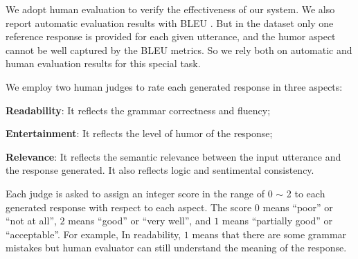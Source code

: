 \documentclass[letterpaper]{article} %
\begin{document}
\begin{CJK*}{UTF8}{gbsn}
We adopt human evaluation to verify the effectiveness of our system. We also report automatic evaluation results with BLEU \cite{papineni2002bleu}. But in the dataset only one reference response is provided for each given utterance, and the humor aspect cannot be well captured by the BLEU metrics. %
So we rely both on automatic and human evaluation results for this special task. 

We employ two human judges to rate each generated response in three aspects:

\textbf{Readability}: It reflects the grammar correctness and fluency;

\textbf{Entertainment}: It reflects the level of humor of the response;

\textbf{Relevance}: It reflects the semantic relevance between the input utterance and the response generated. It also reflects logic and sentimental consistency.

Each judge is asked to assign an integer score in the range of 0 $\sim$ 2 to each generated response with respect to each aspect. The score $0$ means ``poor'' or ``not at all'', $2$ means ``good'' or ``very well'', and $1$ means ``partially good'' or ``acceptable''. For example, In readability, $1$ means that there are some grammar mistakes but human evaluator can still understand the meaning of the response. 




\end{CJK*}
\end{document}
